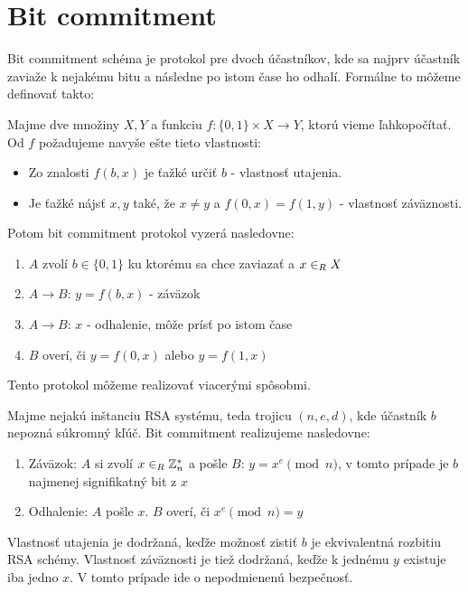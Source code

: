 \section{Bit commitment}

Bit commitment schéma je protokol pre dvoch účastníkov, kde sa najprv účastník
zaviaže k nejakému bitu a následne po istom čase ho odhalí.
Formálne to môžeme definovať takto:

\begin{definicia}
Majme dve množiny $X,Y$ a funkciu $f\colon \{0,1\} \times X \to Y$, ktorú vieme
\clqq ľahko\crqq počítať. Od $f$ požadujeme navyše ešte tieto vlastnosti:
\begin{itemize}
\item Zo znalosti $f(b,x)$ je ťažké určiť $b$ - vlastnosť utajenia.
\item Je ťažké nájsť $x, y$ také, že $x \neq y$ a $f(0,x) = f(1,y)$ - vlastnosť záväznosti.
\end{itemize}
Potom bit commitment protokol vyzerá nasledovne:
\begin{enumerate}
\item $A$ zvolí $b \in \{0,1\}$ ku ktorému sa chce zaviazať a $x \in_{R} X$
\item $A \to B$: $y = f(b,x)$ - záväzok
\item $A \to B$: $x$ - odhalenie, môže prísť po istom čase
\item $B$ overí, či $y = f(0,x)$ alebo $y = f(1,x)$
\end{enumerate}
\end{definicia}

Tento protokol môžeme realizovať viacerými spôsobmi. 


Majme nejakú inštanciu RSA systému, teda trojicu $(n,e,d)$, kde účastník $b$ nepozná súkromný kľúč.
Bit commitment realizujeme nasledovne:
\begin{enumerate}
\item Záväzok: $A$ si zvolí $x \in_{R} \mathbb{Z}_n^*$ a pošle $B$: $y = x^e \pmod n$, v tomto prípade je $b$ najmenej signifikatný bit z $x$
\item Odhalenie: $A$ pošle $x$. $B$ overí, či $x^e \pmod n = y$
\end{enumerate}

Vlastnosť utajenia je dodržaná, keďže možnosť zistiť $b$ je ekvivalentná rozbitiu RSA schémy.
Vlastnosť záväznosti je tiež dodržaná, keďže k jednému $y$ existuje iba jedno $x$. V tomto prípade ide o nepodmienenú bezpečnosť.



